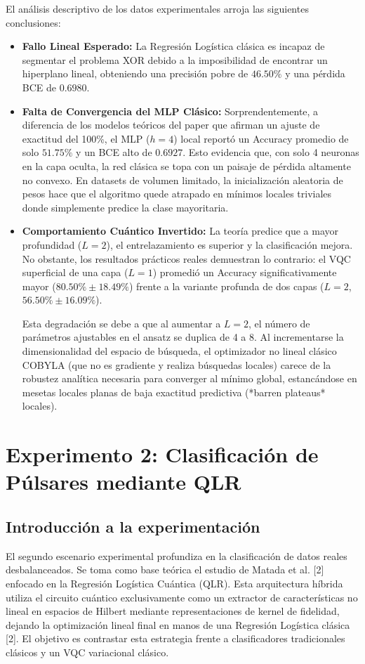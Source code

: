 \documentclass[12pt,oneside]{report}
\begin{document}
El análisis descriptivo de los datos experimentales arroja las siguientes conclusiones:
\begin{itemize}
    \item \textbf{Fallo Lineal Esperado:} La Regresión Logística clásica es incapaz de segmentar el problema XOR debido a la imposibilidad de encontrar un hiperplano lineal, obteniendo una precisión pobre de $46.50\%$ y una pérdida BCE de $0.6980$.
    \item \textbf{Falta de Convergencia del MLP Clásico:} Sorprendentemente, a diferencia de los modelos teóricos del paper que afirman un ajuste de exactitud del 100\%, el MLP ($h=4$) local reportó un Accuracy promedio de solo $51.75\%$ y un BCE alto de $0.6927$. Esto evidencia que, con solo 4 neuronas en la capa oculta, la red clásica se topa con un paisaje de pérdida altamente no convexo. En datasets de volumen limitado, la inicialización aleatoria de pesos hace que el algoritmo quede atrapado en mínimos locales triviales donde simplemente predice la clase mayoritaria.
    \item \textbf{Comportamiento Cuántico Invertido:} La teoría predice que a mayor profundidad ($L=2$), el entrelazamiento es superior y la clasificación mejora. No obstante, los resultados prácticos reales demuestran lo contrario: el VQC superficial de una capa ($L=1$) promedió un Accuracy significativamente mayor ($80.50\% \pm 18.49\%$) frente a la variante profunda de dos capas ($L=2$, $56.50\% \pm 16.09\%$).
    
    Esta degradación se debe a que al aumentar a $L=2$, el número de parámetros ajustables en el ansatz se duplica de 4 a 8. Al incrementarse la dimensionalidad del espacio de búsqueda, el optimizador no lineal clásico COBYLA (que no es gradiente y realiza búsquedas locales) carece de la robustez analítica necesaria para converger al mínimo global, estancándose en mesetas locales planas de baja exactitud predictiva (*barren plateaus* locales).
\end{itemize}

\section{Experimento 2: Clasificación de Púlsares mediante QLR}

\subsection{Introducción a la experimentación}
El segundo escenario experimental profundiza en la clasificación de datos reales desbalanceados. Se toma como base teórica el estudio de Matada et al. [2] enfocado en la Regresión Logística Cuántica (QLR). Esta arquitectura híbrida utiliza el circuito cuántico exclusivamente como un extractor de características no lineal en espacios de Hilbert mediante representaciones de kernel de fidelidad, dejando la optimización lineal final en manos de una Regresión Logística clásica [2]. El objetivo es contrastar esta estrategia frente a clasificadores tradicionales clásicos y un VQC variacional clásico.
\end{document}
